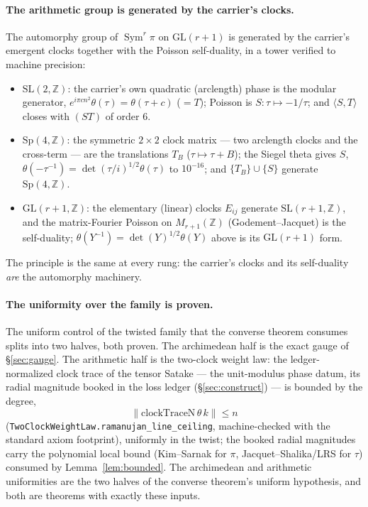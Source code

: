 \documentclass[11pt]{article}
\theoremstyle{definition}
\newcommand{\Sym}{\operatorname{Sym}}
\begin{document}
\paragraph{The arithmetic group is generated by the carrier's clocks.} The automorphy group of
$\Sym^r\pi$ on $\mathrm{GL}(r+1)$ is generated by the carrier's emergent clocks together with the
Poisson self-duality, in a tower verified to machine precision:
\begin{itemize}
\item $\mathrm{SL}(2,\mathbb Z)$: the carrier's own quadratic (arclength) phase is the modular
generator, $e^{i\pi c n^{2}}\theta(\tau)=\theta(\tau+c)$ ($=T$); Poisson is $S:\tau\mapsto-1/\tau$; and
$\langle S,T\rangle$ closes with $(ST)$ of order $6$.
\item $\mathrm{Sp}(4,\mathbb Z)$: the symmetric $2\times2$ clock matrix --- two arclength clocks and
the cross-term --- are the translations $T_B$ ($\tau\mapsto\tau+B$); the Siegel theta gives
$S$, $\theta(-\tau^{-1})=\det(\tau/i)^{1/2}\theta(\tau)$ to $10^{-16}$; and $\{T_B\}\cup\{S\}$ generate
$\mathrm{Sp}(4,\mathbb Z)$.
\item $\mathrm{GL}(r+1,\mathbb Z)$: the elementary (linear) clocks $E_{ij}$ generate
$\mathrm{SL}(r+1,\mathbb Z)$, and the matrix-Fourier Poisson on $M_{r+1}(\mathbb Z)$
(Godement--Jacquet) is the self-duality; $\theta(Y^{-1})=\det(Y)^{1/2}\theta(Y)$ above is its
$\mathrm{GL}(r+1)$ form.
\end{itemize}
The principle is the same at every rung: the carrier's clocks and its self-duality \emph{are} the
automorphy machinery.

\paragraph{The uniformity over the family is proven.} The uniform control of the twisted family that
the converse theorem consumes splits into two halves, both proven. The archimedean half is the exact
gauge of \S\ref{sec:gauge}. The arithmetic half is the two-clock weight law: the ledger-normalized
clock trace of the tensor Satake --- the unit-modulus phase datum, its radial magnitude booked in
the loss ledger (\S\ref{sec:construct}) --- is bounded by the degree,
\[
  \big\|\mathrm{clockTraceN}\,\theta\,k\big\|\le n
\]
(\texttt{TwoClockWeightLaw.ramanujan\_line\_ceiling}, machine-checked with the standard axiom
footprint), uniformly in the twist; the booked radial magnitudes carry the polynomial local bound
(Kim--Sarnak for $\pi$, Jacquet--Shalika/LRS for $\tau$) consumed by Lemma~\ref{lem:bounded}. The
archimedean and arithmetic uniformities are the two halves of the converse theorem's uniform
hypothesis, and both are theorems with exactly these inputs.
\end{document}
